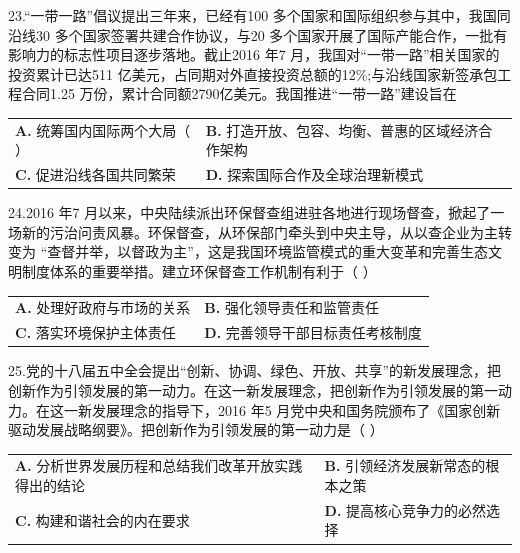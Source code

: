 \documentclass[UTF8,11pt]{ctexart}
\begin{document}
23.“一带一路”倡议提出三年来，已经有100 多个国家和国际组织参与其中，我国同沿线30 多个国家签署共建合作协议，与20 多个国家开展了国际产能合作，一批有影响力的标志性项目逐步落地。截止2016 年7 月，我国对“一带一路”相关国家的投资累计已达511 亿美元，占同期对外直接投资总额的12\%;与沿线国家新签承包工程合同1.25 万份，累计合同额2790亿美元。我国推进“一带一路”建设旨在


\begin{center}\begin{tabular}{>{\raggedright\arraybackslash}p{\dimexpr(\linewidth-4\tabcolsep)/2\relax}>{\raggedright\arraybackslash}p{\dimexpr(\linewidth-4\tabcolsep)/2\relax}}
\textbf{A.} 统筹国内国际两个大局（     ） & \textbf{B.} 打造开放、包容、均衡、普惠的区域经济合作架构\\[.35em]
\textbf{C.} 促进沿线各国共同繁荣 & \textbf{D.} 探索国际合作及全球治理新模式\\[.35em]\end{tabular}\end{center}

24.2016 年7 月以来，中央陆续派出环保督查组进驻各地进行现场督查，掀起了一场新的污治问责风暴。环保督查，从环保部门牵头到中央主导，从以查企业为主转变为 “查督并举，以督政为主”，这是我国环境监管模式的重大变革和完善生态文明制度体系的重要举措。建立环保督查工作机制有利于（     ）


\begin{center}\begin{tabular}{>{\raggedright\arraybackslash}p{\dimexpr(\linewidth-4\tabcolsep)/2\relax}>{\raggedright\arraybackslash}p{\dimexpr(\linewidth-4\tabcolsep)/2\relax}}
\textbf{A.} 处理好政府与市场的关系 & \textbf{B.} 强化领导责任和监管责任\\[.35em]
\textbf{C.} 落实环境保护主体责任 & \textbf{D.} 完善领导干部目标责任考核制度\\[.35em]\end{tabular}\end{center}

25.党的十八届五中全会提出“创新、协调、绿色、开放、共享”的新发展理念，把创新作为引领发展的第一动力。在这一新发展理念，把创新作为引领发展的第一动力。在这一新发展理念的指导下，2016 年5 月党中央和国务院颁布了《国家创新驱动发展战略纲要》。把创新作为引领发展的第一动力是（     ）


\begin{center}\begin{tabular}{>{\raggedright\arraybackslash}p{\dimexpr(\linewidth-4\tabcolsep)/2\relax}>{\raggedright\arraybackslash}p{\dimexpr(\linewidth-4\tabcolsep)/2\relax}}
\textbf{A.} 分析世界发展历程和总结我们改革开放实践得出的结论 & \textbf{B.} 引领经济发展新常态的根本之策\\[.35em]
\textbf{C.} 构建和谐社会的内在要求 & \textbf{D.} 提高核心竞争力的必然选择\\[.35em]\end{tabular}\end{center}
\end{document}
